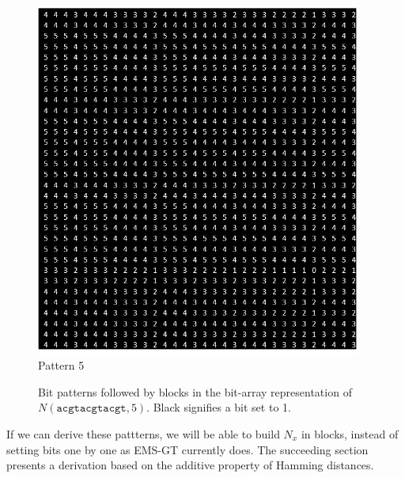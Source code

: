 \documentclass[oneside,12pt]{DISCSthesis}
\begin{document}
{\begin{figure}[h]
			\begin{minipage}{.135\textwidth}\centering\includegraphics[width=0.95\textwidth]{img/5}\\ Pattern 5 \end{minipage}
			\newline\newline
			\caption{Bit patterns followed by blocks in the bit-array representation of $N(\texttt{acgtacgtacgt}, 5)$. 
			Black signifies a bit set to 1.}
			\end{figure}

		\noindent If we can derive these pattterns, we will be able to build $N_x$ in blocks, instead of setting bits one by one as EMS-GT currently does. The succeeding section presents a derivation based on the additive property of Hamming distances.
		\newpage

}
\end{document}
